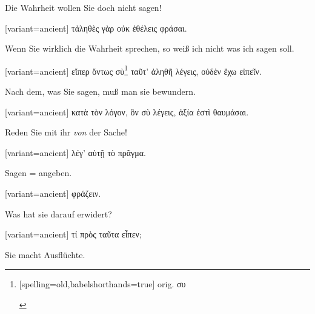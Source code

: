 Die Wahrheit wollen Sie doch nicht sagen! 

\switchcolumn

\begin{greek}[variant=ancient]%
τἀληθὲς γὰρ οὐκ ἐθέλεις φράσαι.

\end{greek}%
\switchcolumn*

Wenn Sie wirklich die Wahrheit sprechen, so weiß ich nicht was ich
sagen soll. 

\switchcolumn

\begin{greek}[variant=ancient]%
εἴπερ ὄντως σὺ\footnote{\begin{german}[spelling=old,babelshorthands=true]%
orig. \textgreek[variant=ancient]{συ}\end{german}%
} ταῦτ' ἀληθῆ λέγεις, οὐδὲν ἔχω εἰπεῖν.

\end{greek}%
\switchcolumn*

Nach dem, was Sie sagen, muß man sie bewundern. 

\switchcolumn

\begin{greek}[variant=ancient]%
κατὰ τὸν λόγον, ὃν σὺ λέγεις, ἀξία ἐστὶ θαυμάσαι.

\end{greek}%
\switchcolumn*

Reden Sie mit ihr \emph{von} der Sache! 

\switchcolumn

\begin{greek}[variant=ancient]%
λέγ' αὐτῇ τὸ πρᾶγμα.

\end{greek}%
\switchcolumn*

Sagen = angeben.

\switchcolumn

\begin{greek}[variant=ancient]%
φράζειν.

\end{greek}%
\switchcolumn*

Was hat sie darauf erwidert? 

\switchcolumn

\begin{greek}[variant=ancient]%
τί πρὸς ταῦτα εἶπεν;

\end{greek}%
\switchcolumn*

Sie macht Aus\textcompwordmark{}flüchte.

